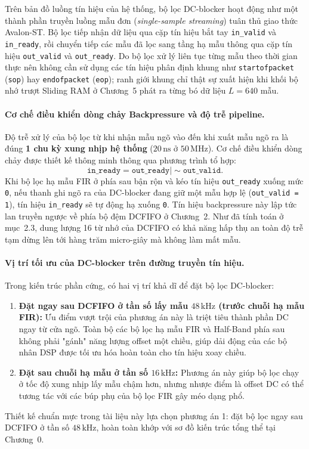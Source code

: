 Trên bản đồ luồng tín hiệu của hệ thống, bộ lọc DC-blocker hoạt động như một thành phần truyền luồng mẫu đơn (\emph{single-sample streaming}) tuân thủ giao thức Avalon-ST. Bộ lọc tiếp nhận dữ liệu qua cặp tín hiệu bắt tay \texttt{in\_valid} và \texttt{in\_ready}, rồi chuyển tiếp các mẫu đã lọc sang tầng hạ mẫu thông qua cặp tín hiệu \texttt{out\_valid} và \texttt{out\_ready}. Do bộ lọc xử lý liên tục từng mẫu theo thời gian thực nên không cần sử dụng các tín hiệu phân định khung như \texttt{startofpacket} (\texttt{sop}) hay \texttt{endofpacket} (\texttt{eop}); ranh giới khung chỉ thật sự xuất hiện khi khối bộ nhớ trượt Sliding RAM ở Chương~5 phát ra từng bó dữ liệu $L = 640$ mẫu.

\paragraph{Cơ chế điều khiển dòng chảy Backpressure và độ trễ pipeline.}
Độ trễ xử lý của bộ lọc từ khi nhận mẫu ngõ vào đến khi xuất mẫu ngõ ra là đúng \textbf{1 chu kỳ xung nhịp hệ thống} ($20\,\text{ns}$ ở $50\,\text{MHz}$). Cơ chế điều khiển dòng chảy được thiết kế thông minh thông qua phương trình tổ hợp:
\begin{equation}
\texttt{in\_ready} = \texttt{out\_ready} \mid \sim\!\texttt{out\_valid}.
\end{equation}
Khi bộ lọc hạ mẫu FIR ở phía sau bận rộn và kéo tín hiệu \texttt{out\_ready} xuống mức \texttt{0}, nếu thanh ghi ngõ ra của DC-blocker đang giữ một mẫu hợp lệ (\texttt{out\_valid = 1}), tín hiệu \texttt{in\_ready} sẽ tự động hạ xuống \texttt{0}. Tín hiệu backpressure này lập tức lan truyền ngược về phía bộ đệm DCFIFO ở Chương~2. Như đã tính toán ở mục~2.3, dung lượng 16 từ nhớ của DCFIFO có khả năng hấp thụ an toàn độ trễ tạm dừng lên tới hàng trăm micro-giây mà không làm mất mẫu.

\paragraph{Vị trí tối ưu của DC-blocker trên đường truyền tín hiệu.}
Trong kiến trúc phần cứng, có hai vị trí khả dĩ để đặt bộ lọc DC-blocker:
\begin{enumerate}
    \item \textbf{Đặt ngay sau DCFIFO ở tần số lấy mẫu $48\,\text{kHz}$ (trước chuỗi hạ mẫu FIR):} Ưu điểm vượt trội của phương án này là triệt tiêu thành phần DC ngay từ cửa ngõ. Toàn bộ các bộ lọc hạ mẫu FIR và Half-Band phía sau không phải "gánh" năng lượng offset một chiều, giúp dải động của các bộ nhân DSP được tối ưu hóa hoàn toàn cho tín hiệu xoay chiều.
    \item \textbf{Đặt sau chuỗi hạ mẫu ở tần số $16\,\text{kHz}$:} Phương án này giúp bộ lọc chạy ở tốc độ xung nhịp lấy mẫu chậm hơn, nhưng nhược điểm là offset DC có thể tương tác với các búp phụ của bộ lọc FIR gây méo dạng phổ.
\end{enumerate}
Thiết kế chuẩn mực trong tài liệu này lựa chọn phương án 1: đặt bộ lọc ngay sau DCFIFO ở tần số $48\,\text{kHz}$, hoàn toàn khớp với sơ đồ kiến trúc tổng thể tại Chương~0.

